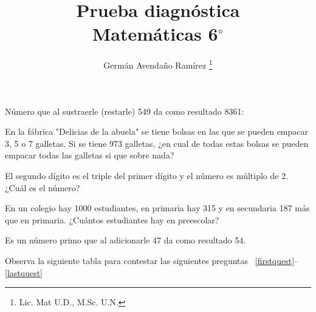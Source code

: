 \documentclass[10pt,letterpaper,addpoints]{exam}
\begin{document}
\title{Prueba diagnóstica\\Matem\'{a}ticas 6$^\circ$}
\author{Germ\'{a}n Avendaño Ram\'{i}rez \thanks{Lic. Mat U.D., M.Sc. U.N.}}
\date{}
\maketitle
\printanswers
\begin{center}
\end{center}
\begin{questions}
\question
Número que al sustraerle (restarle) 549 da como resultado 8361:

\begin{oneparchoices}
\end{oneparchoices}
\question
En la fábrica "Delicias de la abuela" se tiene bolsas en las que se pueden empacar 3, 5 o 7 galletas. Si se tiene 973 galletas, ¿en cual de todas estas bolsas se pueden empacar todas las galletas si que sobre nada?

\begin{oneparchoices}
\end{oneparchoices}
\question
El segundo dígito es el triple del primer dígito y el número es múltiplo de 2. ¿Cuál es el número?

\begin{oneparchoices}
\end{oneparchoices}
\question 
En un colegio hay 1000 estudiantes, en primaria hay 315 y en secundaria 187 más que en primaria. ¿Cuántos estudiantes hay en preescolar?

\begin{oneparchoices}
\end{oneparchoices}
\question
Es un n\'umero primo que al adicionarle 47 da como resultado 54.

\begin{oneparchoices}
\end{oneparchoices}

\begin{minipage}{.4\textwidth}{Observa la siguiente tabla para contestar las siguientes preguntas ~\ref{firstquest}--\ref{lastquest}

}
\end{minipage}
\end{questions}
\end{document}
